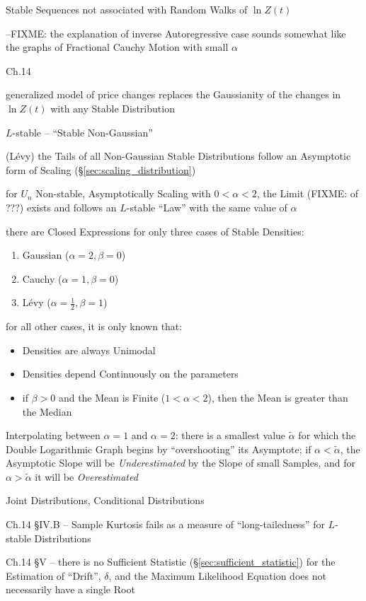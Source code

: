 Stable Sequences not associated with Random Walks of $\ln Z(t)$

--FIXME: the explanation of inverse Autoregressive case sounds somewhat like the
graphs of Fractional Cauchy Motion with small $\alpha$

Ch.14

generalized model of price changes replaces the Gaussianity of the changes in
$\ln Z(t)$ with any Stable Distribution

$L$-stable -- ``Stable Non-Gaussian''

(L\'evy) the Tails of all Non-Gaussian Stable Distributions follow an Asymptotic
form of Scaling (\S\ref{sec:scaling_distribution})

for $U_n$ Non-stable, Asymptotically Scaling with $0 < \alpha < 2$, the Limit
(FIXME: of ???) exists and follows an $L$-stable ``Law'' with the same value of
$\alpha$

there are Closed Expressions for only three cases of Stable Densities:
\begin{enumerate}
  \item Gaussian ($\alpha = 2, \beta = 0$)
  \item Cauchy ($\alpha = 1, \beta = 0$)
  \item L\'evy ($\alpha = \frac{1}{2}, \beta = 1$)
\end{enumerate}
for all other cases, it is only known that:
\begin{itemize}
  \item Densities are always Unimodal
  \item Densities depend Continuously on the parameters
  \item if $\beta > 0$ and the Mean is Finite ($1 < \alpha < 2$), then the Mean
    is greater than the Median
\end{itemize}

Interpolating between $\alpha = 1$ and $\alpha = 2$: there is a smallest value
$\tilde{\alpha}$ for which the Double Logarithmic Graph begins by
``overshooting'' its Asymptote; if $\alpha < \tilde{\alpha}$, the Asymptotic
Slope will be \emph{Underestimated} by the Slope of small Samples, and for
$\alpha > \tilde{\alpha}$ it will be \emph{Overestimated}

Joint Distributions, Conditional Distributions

Ch.14 \S IV.B -- Sample Kurtosis fails as a measure of ``long-tailedness'' for
$L$-stable Distributions

Ch.14 \S V -- there is no Sufficient Statistic
(\S\ref{sec:sufficient_statistic}) for the Estimation of ``Drift'', $\delta$,
and the Maximum Likelihood Equation does not necessarily have a single Root

